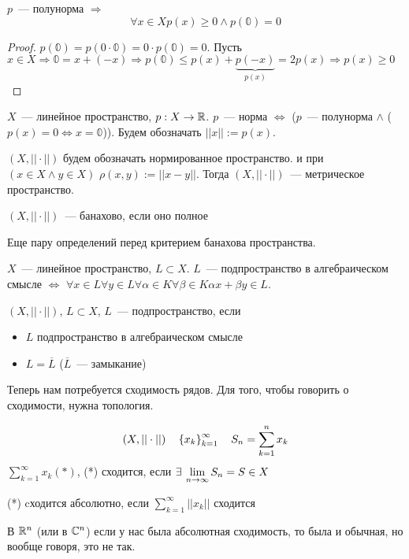 \documentclass[document]{subfiles}
\begin{document}
\begin{property}
    $p$~--- полунорма $\Rightarrow$
    \[ \forall x \in X p(x) \geq 0 \land p(\mathbb{0}) = 0 \]
\end{property}

\begin{proof}
    $p(\mathbb{0}) = p(0 \cdot \mathbb{0}) = 0 \cdot p(\mathbb{0}) = 0$.
    Пусть $x \in X \Rightarrow \mathbb{0} = x + (-x) \Rightarrow p(\mathbb{0}) \leq p(x) + \underbrace{p(-x)}_{p(x)} = 2p(x) \Rightarrow p(x) \geq 0$
\end{proof}

\begin{definition}[Норма]
    $X$~--- линейное пространство, $p : X \rightarrow \mathbb{R}$. $p$~--- норма $\Leftrightarrow $ ($p$~--- полунорма $\land $ ($p(x) = 0 \Leftrightarrow x = \mathbb{0}$)).
    Будем обозначать $||x|| := p(x)$.
\end{definition}
$(X, || \cdot ||)$ будем обозначать нормированное пространство. и при $(x \in X \land y \in X)$ $\rho(x,y) := ||x-y||$. Тогда $(X,||\cdot ||)$~--- метрическое пространство.

\begin{definition}
    $(X, || \cdot ||)$~--- банахово, если оно полное
\end{definition}
Еще пару определений перед критерием банахова пространства.

\begin{definition}
    $X$~--- линейное пространство, $L \subset X$. $L$~--- подпространство в алгебраическом смысле $\Leftrightarrow$ $\forall x \in L \forall y \in L \forall \alpha \in K \forall \beta \in K \alpha x + \beta y \in L$.
\end{definition}

\begin{definition}[подпространство]
    $(X, || \cdot ||)$, $L \subset X$, $L$~--- подпространство, если
    \begin{itemize}
        \item $L$ подпространство в алгебраическом смысле
        \item $L = \overline{L}$ ($\overline{L}$~--- замыкание)
    \end{itemize}
\end{definition}

Теперь нам потребуется сходимость рядов. Для того, чтобы говорить о сходимости, нужна топология.

\begin{definition}[Cходимость]
    \[(X, || \cdot ||) \quad \left\{x_k\right\}^\infty_{k=1} \quad S_n = \sum^n_{k=1} x_k \]
    $\sum_{k=1}^\infty x_k (*)$,  
    (*) сходится, если $\exists \liml_{n \to \infty}{S_n} = S \in X$

    (*) cходится абсолютно, если $\sum^\infty_{k=1} ||x_k||$ сходится
\end{definition}
В $\mathbb{R}^n$ (или в $\mathbb{C}^n$) если у нас была абсолютная сходимость, то была и обычная, но вообще говоря, это не так.
\end{document}

